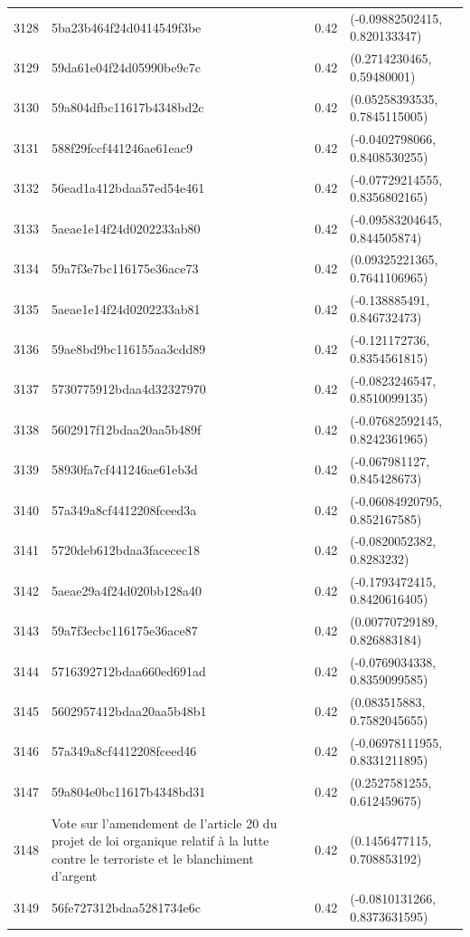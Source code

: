\begin{table}[ht]
\begin{tabular}{rlrl}
  3128 & 5ba23b464f24d0414549f3be & 0.42 & (-0.09882502415, 0.820133347) \\ 
  3129 & 59da61e04f24d05990be9c7c & 0.42 & (0.2714230465, 0.59480001) \\ 
  3130 & 59a804dfbc11617b4348bd2c & 0.42 & (0.05258393535, 0.7845115005) \\ 
  3131 & 588f29fccf441246ae61eac9 & 0.42 & (-0.0402798066, 0.8408530255) \\ 
  3132 & 56ead1a412bdaa57ed54e461 & 0.42 & (-0.07729214555, 0.8356802165) \\ 
  3133 & 5aeae1e14f24d0202233ab80 & 0.42 & (-0.09583204645, 0.844505874) \\ 
  3134 & 59a7f3e7bc116175e36ace73 & 0.42 & (0.09325221365, 0.7641106965) \\ 
  3135 & 5aeae1e14f24d0202233ab81 & 0.42 & (-0.138885491, 0.846732473) \\ 
  3136 & 59ae8bd9bc116155aa3cdd89 & 0.42 & (-0.121172736, 0.8354561815) \\ 
  3137 & 5730775912bdaa4d32327970 & 0.42 & (-0.0823246547, 0.8510099135) \\ 
  3138 & 5602917f12bdaa20aa5b489f & 0.42 & (-0.07682592145, 0.8242361965) \\ 
  3139 & 58930fa7cf441246ae61eb3d & 0.42 & (-0.067981127, 0.845428673) \\ 
  3140 & 57a349a8cf4412208fceed3a & 0.42 & (-0.06084920795, 0.852167585) \\ 
  3141 & 5720deb612bdaa3facecec18 & 0.42 & (-0.0820052382, 0.8283232) \\ 
  3142 & 5aeae29a4f24d020bb128a40 & 0.42 & (-0.1793472415, 0.8420616405) \\ 
  3143 & 59a7f3ecbc116175e36ace87 & 0.42 & (0.00770729189, 0.826883184) \\ 
  3144 & 5716392712bdaa660ed691ad & 0.42 & (-0.0769034338, 0.8359099585) \\ 
  3145 & 5602957412bdaa20aa5b48b1 & 0.42 & (0.083515883, 0.7582045655) \\ 
  3146 & 57a349a8cf4412208fceed46 & 0.42 & (-0.06978111955, 0.8331211895) \\ 
  3147 & 59a804e0bc11617b4348bd31 & 0.42 & (0.2527581255, 0.612459675) \\ 
  3148 & Vote sur l'amendement de l'article 20 du projet de loi organique relatif à la lutte contre le terroriste et le blanchiment d'argent & 0.42 & (0.1456477115, 0.708853192) \\ 
  3149 & 56fe727312bdaa5281734e6c & 0.42 & (-0.0810131266, 0.8373631595) \\ 

\end{tabular}
\end{table}
